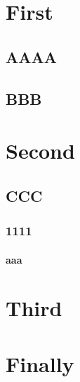 
\chapter{First} %
\label{cha:first}

\section{AAAA} %
\label{sec:aaaa}


\section{BBB} %
\label{sec:bbb}



\chapter{Second} %
\label{cha:second}

\section{CCC} %
\label{sec:ccc}

\subsection{1111} %
\label{sub:1111}

\subsubsection{aaa} %
\label{sub:aaa}



\chapter{Third} %
\label{cha:third}


\chapter{Finally} %
\label{cha:finally}

